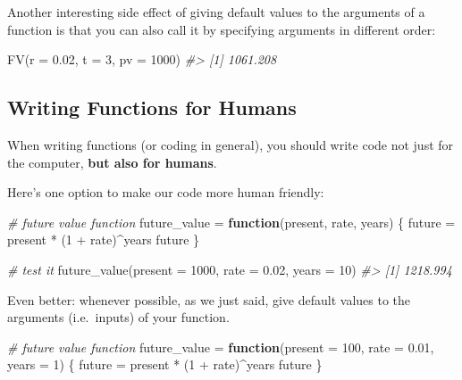 \documentclass[
]{book}
\newenvironment{Shaded}{\begin{snugshade}}{\end{snugshade}}
\newcommand{\AttributeTok}[1]{\textcolor[rgb]{0.77,0.63,0.00}{#1}}
\newcommand{\CommentTok}[1]{\textcolor[rgb]{0.56,0.35,0.01}{\textit{#1}}}
\newcommand{\ControlFlowTok}[1]{\textcolor[rgb]{0.13,0.29,0.53}{\textbf{#1}}}
\newcommand{\DecValTok}[1]{\textcolor[rgb]{0.00,0.00,0.81}{#1}}
\newcommand{\FloatTok}[1]{\textcolor[rgb]{0.00,0.00,0.81}{#1}}
\newcommand{\FunctionTok}[1]{\textcolor[rgb]{0.00,0.00,0.00}{#1}}
\newcommand{\NormalTok}[1]{#1}
\newcommand{\OtherTok}[1]{\textcolor[rgb]{0.56,0.35,0.01}{#1}}
\newcommand{\SpecialCharTok}[1]{\textcolor[rgb]{0.00,0.00,0.00}{#1}}
\begin{document}
Another interesting side effect of giving default values to the arguments of
a function is that you can also call it by specifying arguments in different
order:

\begin{Shaded}
\begin{Highlighting}[]
\FunctionTok{FV}\NormalTok{(}\AttributeTok{r =} \FloatTok{0.02}\NormalTok{, }\AttributeTok{t =} \DecValTok{3}\NormalTok{, }\AttributeTok{pv =} \DecValTok{1000}\NormalTok{)}
\CommentTok{\#\textgreater{} [1] 1061.208}
\end{Highlighting}
\end{Shaded}

\hypertarget{writing-functions-for-humans}{%
\subsection{Writing Functions for Humans}\label{writing-functions-for-humans}}

When writing functions (or coding in general), you should write code not just
for the computer, \textbf{but also for humans}.

Here's one option to make our code more human friendly:

\begin{Shaded}
\begin{Highlighting}[]
\CommentTok{\# future value function}
\NormalTok{future\_value }\OtherTok{=} \ControlFlowTok{function}\NormalTok{(present, rate, years) \{}
\NormalTok{  future }\OtherTok{=}\NormalTok{ present }\SpecialCharTok{*}\NormalTok{ (}\DecValTok{1} \SpecialCharTok{+}\NormalTok{ rate)}\SpecialCharTok{\^{}}\NormalTok{years}
\NormalTok{  future}
\NormalTok{\}}

\CommentTok{\# test it}
\FunctionTok{future\_value}\NormalTok{(}\AttributeTok{present =} \DecValTok{1000}\NormalTok{, }\AttributeTok{rate =} \FloatTok{0.02}\NormalTok{, }\AttributeTok{years =} \DecValTok{10}\NormalTok{)}
\CommentTok{\#\textgreater{} [1] 1218.994}
\end{Highlighting}
\end{Shaded}

Even better: whenever possible, as we just said, give default values to the
arguments (i.e.~inputs) of your function.

\begin{Shaded}
\begin{Highlighting}[]
\CommentTok{\# future value function}
\NormalTok{future\_value }\OtherTok{=} \ControlFlowTok{function}\NormalTok{(}\AttributeTok{present =} \DecValTok{100}\NormalTok{, }\AttributeTok{rate =} \FloatTok{0.01}\NormalTok{, }\AttributeTok{years =} \DecValTok{1}\NormalTok{) \{}
\NormalTok{  future }\OtherTok{=}\NormalTok{ present }\SpecialCharTok{*}\NormalTok{ (}\DecValTok{1} \SpecialCharTok{+}\NormalTok{ rate)}\SpecialCharTok{\^{}}\NormalTok{years}
\NormalTok{  future}
\NormalTok{\}}
\end{Highlighting}
\end{Shaded}
\end{document}
